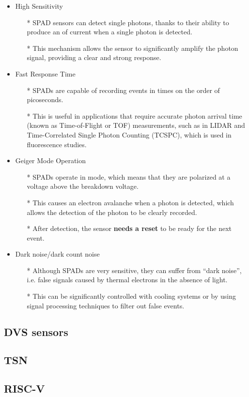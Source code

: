 \begin{itemize}
\item High Sensitivity
    \begin{itemize}
    \item[*] SPAD sensors can detect single photons, thanks to their ability to produce an  of current when a single photon is detected.
    \item[*] This mechanism allows the sensor to significantly amplify the photon signal, providing a clear and strong response.
    \end{itemize}
\item Fast Response Time
    \begin{itemize}
    \item[*] SPADs are capable of recording events in times on the order of picoseconds.
    \item[*] This is useful in applications that require accurate photon arrival time (known as Time-of-Flight or TOF) measurements, such as in LIDAR and Time-Correlated Single Photon Counting (TCSPC), which is used in fluorescence studies.
    \end{itemize}
\item Geiger Mode Operation
    \begin{itemize}
    \item[*] SPADs operate in  mode, which means that they are polarized at a voltage above the breakdown voltage. 
    \item[*] This causes an electron avalanche when a photon is detected, which allows the detection of the photon to be clearly recorded.
    \item[*] After detection, the sensor \textbf{needs a reset} to be ready for the next event.
    \end{itemize}
\item Dark noise/dark count noise
    \begin{itemize}
    \item[*] Although SPADs are very sensitive, they can suffer from “dark noise”, i.e. false signals caused by thermal electrons in the absence of light. 
    \item[*] This can be significantly controlled with cooling systems or by using signal processing techniques to filter out false events.
    \end{itemize}
\end{itemize}

\subsection{DVS sensors}

\subsection{TSN}

\subsection{RISC-V}



